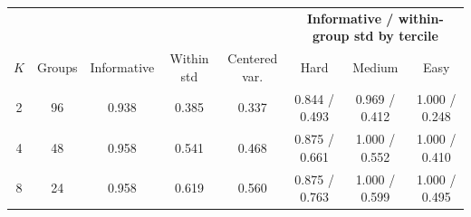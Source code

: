 \begin{tabular}{c c c c c c c c}
  \toprule
  & & & & & \multicolumn{3}{c}{\textbf{Informative / within-group std by tercile}} \\
  $K$ & Groups & Informative & Within std & Centered var. & Hard & Medium & Easy \\
  \midrule
    2 & 96 & 0.938 & 0.385 & 0.337 & 0.844 / 0.493 & 0.969 / 0.412 & 1.000 / 0.248 \\
    4 & 48 & 0.958 & 0.541 & 0.468 & 0.875 / 0.661 & 1.000 / 0.552 & 1.000 / 0.410 \\
    8 & 24 & 0.958 & 0.619 & 0.560 & 0.875 / 0.763 & 1.000 / 0.599 & 1.000 / 0.495 \\
  \bottomrule
\end{tabular}
